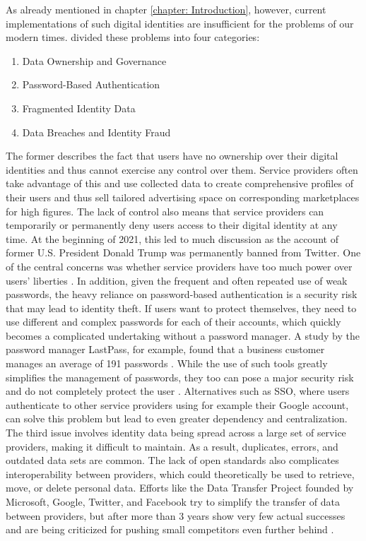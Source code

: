 As already mentioned in chapter \ref{chapter: Introduction}, however, current implementations of such digital identities are insufficient for the problems of our modern times. \cite{soltani_survey_2021} divided these problems into four categories:
\begin{enumerate}
	\item Data Ownership and Governance
	\item Password-Based Authentication
	\item Fragmented Identity Data
	\item Data Breaches and Identity Fraud
\end{enumerate}
The former describes the fact that users have no ownership over their digital identities and thus cannot exercise any control over them. Service providers often take advantage of this and use collected data to create comprehensive profiles of their users and thus sell tailored advertising space on corresponding marketplaces for high figures. The lack of control also means that service providers can temporarily or permanently deny users access to their digital identity at any time. At the beginning of 2021, this led to much discussion as the account of former U.S. President Donald Trump was permanently banned from Twitter. One of the central concerns was whether service providers have too much power over users' liberties \cite{noor_should_2021}. In addition, given the frequent and often repeated use of weak passwords, the heavy reliance on password-based authentication is a security risk that may lead to identity theft. If users want to protect themselves, they need to use different and complex passwords for each of their accounts, which quickly becomes a complicated undertaking without a password manager. A study by the password manager LastPass, for example, found that a business customer manages an average of 191 passwords \cite{steel_lastpass_2017}. While the use of such tools greatly simplifies the management of passwords, they too can pose a major security risk and do not completely protect the user \cite{oesch_that_2020, ormandy_password_2021, toth_you_2021}. Alternatives such as \acf{SSO}, where users authenticate to other service providers using for example their Google account, can solve this problem but lead to even greater dependency and centralization. The third issue involves identity data being spread across a large set of service providers, making it difficult to maintain. As a result, duplicates, errors, and outdated data sets are common. The lack of open standards also complicates interoperability between providers, which could theoretically be used to retrieve, move, or delete personal data. Efforts like the Data Transfer Project founded by Microsoft, Google, Twitter, and Facebook try to simplify the transfer of data between providers, but after more than 3 years show very few actual successes \cite{minor_google_2020, hollington_surprising_2021, lomas_facebooks_2020} and are being criticized for pushing small competitors even further behind \cite[p. 15]{borgogno_data_2018}. \cite[pp. 2-3]{soltani_survey_2021}


